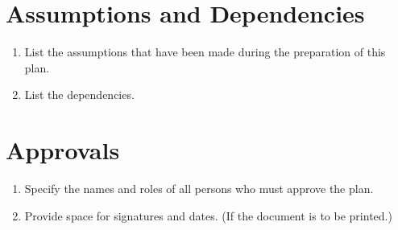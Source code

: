\section{Assumptions and Dependencies}

\begin{enumerate}
	\item List the assumptions that have been made during the preparation of this plan.
	\item List the dependencies.
\end{enumerate}

\section{Approvals}

\begin{enumerate}
	\item Specify the names and roles of all persons who must approve the plan.
	\item Provide space for signatures and dates. (If the document is to be printed.)
\end{enumerate}
